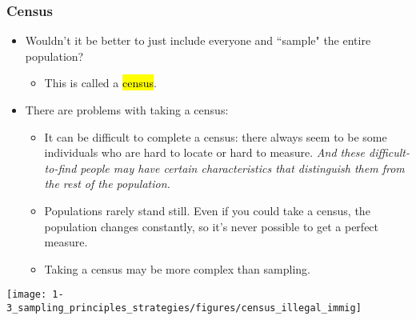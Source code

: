 \begin{frame}
\frametitle{Census}

\begin{itemize}

\item Wouldn't it be better to just include everyone and ``sample" the entire population? 

\begin{itemize}
\item This is called a \hl{census}.
\end{itemize}

\pause

\item There are problems with taking a census:

\begin{itemize}
\item It can be difficult to complete a census: there always seem to be some individuals who are hard to locate or hard to measure. \textit{And these difficult-to-find people may have certain characteristics that distinguish them from the rest of the population.}
\item Populations rarely stand still. Even if you could take a census, the population changes constantly, so it's never possible to get a perfect measure.
\item Taking a census may be more complex than sampling.
\end{itemize}

\end{itemize}

\end{frame}


\begin{frame}

\vfill

\begin{center}
\texttt{[image: 1-3\_sampling\_principles\_strategies/figures/census\_illegal\_immig]}
\end{center}


\end{frame}


